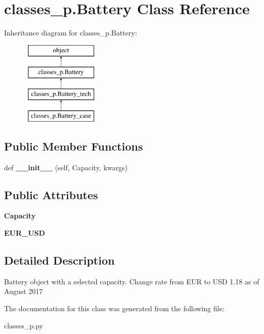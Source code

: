 \hypertarget{classclasses__p_1_1_battery}{}\section{classes\+\_\+p.\+Battery Class Reference}
\label{classclasses__p_1_1_battery}
Inheritance diagram for classes\+\_\+p.\+Battery\+:\begin{figure}[H]
\begin{center}
\leavevmode
\includegraphics[height=4.000000cm]{classclasses__p_1_1_battery}
\end{center}
\end{figure}
\subsection*{Public Member Functions}
\begin{DoxyCompactItemize}
\item 
\mbox{\label{classclasses__p_1_1_battery_a0ad02df91eb593bb61bc4d74459fd1e6}} 
def {\bfseries \+\_\+\+\_\+init\+\_\+\+\_\+} (self, Capacity, kwargs)
\end{DoxyCompactItemize}
\subsection*{Public Attributes}
\begin{DoxyCompactItemize}
\item 
\mbox{\label{classclasses__p_1_1_battery_adbb7d66a4a3bbc88f218268538bd6684}} 
{\bfseries Capacity}
\item 
\mbox{\label{classclasses__p_1_1_battery_a2114af2631793ecf7c0767721180297c}} 
{\bfseries E\+U\+R\+\_\+\+U\+SD}
\end{DoxyCompactItemize}


\subsection{Detailed Description}
\begin{DoxyVerb}Battery object with a selected capacity.
Change rate from EUR to USD 1.18 as of August 2017
\end{DoxyVerb}
 

The documentation for this class was generated from the following file\+:\begin{DoxyCompactItemize}
\item 
classes\+\_\+p.\+py\end{DoxyCompactItemize}
